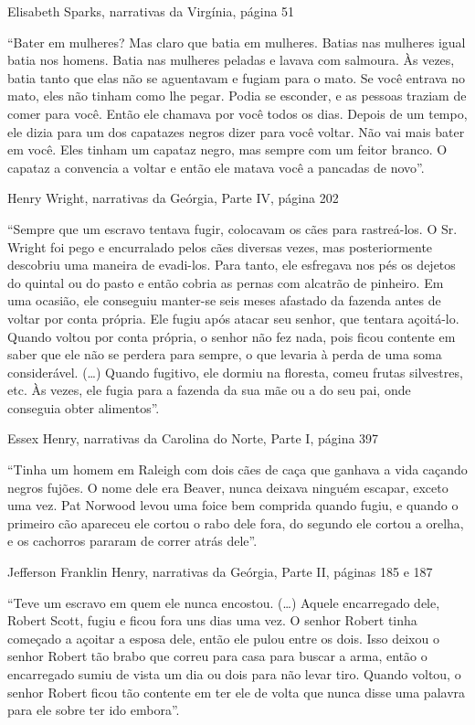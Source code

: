 Elisabeth Sparks, narrativas da Virgínia, página 51

``Bater em mulheres? Mas claro que batia em mulheres. Batias nas
mulheres igual batia nos homens. Batia nas mulheres peladas e lavava com
salmoura. Às vezes, batia tanto que elas não se aguentavam e fugiam para
o mato. Se você entrava no mato, eles não tinham como lhe pegar. Podia
se esconder, e as pessoas traziam de comer para você. Então ele chamava
por você todos os dias. Depois de um tempo, ele dizia para um dos
capatazes negros dizer para você voltar. Não vai mais bater em você.
Eles tinham um capataz negro, mas sempre com um feitor branco. O capataz
a convencia a voltar e então ele matava você a pancadas de novo''.

Henry Wright, narrativas da Geórgia, Parte IV, página 202

``Sempre que um escravo tentava fugir, colocavam os cães para
rastreá-los. O Sr. Wright foi pego e encurralado pelos cães diversas
vezes, mas posteriormente descobriu uma maneira de evadi-los. Para
tanto, ele esfregava nos pés os dejetos do quintal ou do pasto e então
cobria as pernas com alcatrão de pinheiro. Em uma ocasião, ele conseguiu
manter-se seis meses afastado da fazenda antes de voltar por conta
própria. Ele fugiu após atacar seu senhor, que tentara açoitá-lo. Quando
voltou por conta própria, o senhor não fez nada, pois ficou contente em
saber que ele não se perdera para sempre, o que levaria à perda de uma
soma considerável. (\ldots{}) Quando fugitivo, ele dormiu na floresta,
comeu frutas silvestres, etc. Às vezes, ele fugia para a fazenda da sua
mãe ou a do seu pai, onde conseguia obter alimentos''.

Essex Henry, narrativas da Carolina do Norte, Parte I, página 397

``Tinha um homem em Raleigh com dois cães de caça que ganhava a vida
caçando negros fujões. O nome dele era Beaver, nunca deixava ninguém
escapar, exceto uma vez. Pat Norwood levou uma foice bem comprida quando
fugiu, e quando o primeiro cão apareceu ele cortou o rabo dele fora, do
segundo ele cortou a orelha, e os cachorros pararam de correr atrás
dele''.

Jefferson Franklin Henry, narrativas da Geórgia, Parte II, páginas 185 e
187

``Teve um escravo em quem ele nunca encostou. (\ldots{}) Aquele
encarregado dele, Robert Scott, fugiu e ficou fora uns dias uma vez. O
senhor Robert tinha começado a açoitar a esposa dele, então ele pulou
entre os dois. Isso deixou o senhor Robert tão brabo que correu para
casa para buscar a arma, então o encarregado sumiu de vista um dia ou
dois para não levar tiro. Quando voltou, o senhor Robert ficou tão
contente em ter ele de volta que nunca disse uma palavra para ele sobre
ter ido embora''.

